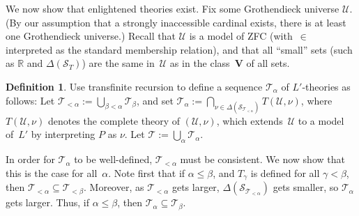 \documentclass[12pt]{article}
\newcommand{\RR}{\mathbb{R}}
\newcommand{\cL}{L'}
\newcommand{\cS}{\mathcal{S}}
\newcommand{\cT}{\mathcal{T}}
\newcommand{\cU}{\mathcal{U}}
\theoremstyle{plain}
\theoremstyle{definition}
\newtheorem{definition}[theorem]{Definition}
\theoremstyle{remark}
\begin{document}
We now show that enlightened theories exist.
Fix some Grothendieck universe $\cU$. (By our assumption that a strongly inaccessible cardinal exists, there is at least one Grothendieck universe.) Recall that $\cU$ is a model of ZFC (with~$\in$ interpreted as the standard membership relation), and that all ``small'' sets (such as $\RR$ and $\Delta(\cS_T)$) are the same in~$\cU$ as in the class~$\mathbf{V}$ of all sets.
\begin{definition}
Use transfinite recursion to define a sequence $\cT_\alpha$ of $\cL$-theories as follows: Let $\cT_{<\alpha} := \bigcup_{\beta<\alpha} \cT_\beta$, and set $\cT_\alpha := \bigcap_{\nu\in\Delta(\cS_{\cT_{<\alpha}})} T(\cU,\nu)$, where $T(\cU,\nu)$ denotes the complete theory of $(\cU,\nu)$, which extends~$\cU$ to a model of~$\cL$ by interpreting $P$ as $\nu$.
Let $\cT := \bigcup_\alpha \cT_\alpha$.
\end{definition}
In order for $\cT_\alpha$ to be well-defined, $\cT_{<\alpha}$ must be consistent. We now show that this is the case for all~$\alpha$.
Note first that if $\alpha\le\beta$, and $T_\gamma$ is defined for all $\gamma<\beta$, then $\cT_{<\alpha}\subseteq\cT_{<\beta}$. Moreover, as $\cT_{<\alpha}$ gets larger, $\Delta(\cS_{\cT_{<\alpha}})$ gets smaller, so $\cT_\alpha$ gets larger. Thus, if $\alpha\le\beta$, then $\cT_\alpha\subseteq\cT_\beta$.
\end{document}
